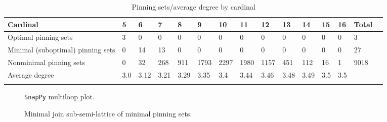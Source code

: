 \documentclass{article}%
\begin{document}
\begin{table}[ht]
	\caption{Pinning sets/average degree by cardinal}
	\centering
	\renewcommand{\arraystretch}{1.5}
	\begin{tabularx}{\textwidth}{lXXXXXXXXXXXXXX}
		\toprule
			Cardinal & 5 & 6 & 7 & 8 & 9 & 10 & 11 & 12 & 13 & 14 & 15 & 16 & Total\\
			\hline
			Optimal pinning sets & 3 & 0 & 0 & 0 & 0 & 0 & 0 & 0 & 0 & 0 & 0 & 0 & 3 \\
			Minimal (suboptimal) pinning sets & 0 & 14 & 13 & 0 & 0 & 0 & 0 & 0 & 0 & 0 & 0 & 0 & 27 \\
			Nonminimal pinning sets & 0 & 32 & 268 & 911 & 1793 & 2297 & 1980 & 1157 & 451 & 112 & 16 & 1 & 9018 \\
			Average degree & 3.0 & 3.12 & 3.21 & 3.29 & 3.35 & 3.4 & 3.44 & 3.46 & 3.48 & 3.49 & 3.5 & 3.5 &  \\
		\bottomrule \\ 
	\end{tabularx}
\end{table}

\begin{multicols}{2}
\begin{figure}[H]
\centering

\caption{\texttt{SnapPy} multiloop plot.}
\label{fig:tex/img/[[18, 22, 1, 19], [19, 12, 20, 11], [17, 28, 18, 23], [21, 13, 22, 14], [1, 13, 2, 12], [20, 2, 21, 3], [10, 23, 11, 24], [5, 16, 6, 17], [6, 27, 7, 28], [14, 7, 15, 8], [3, 25, 4, 24], [4, 9, 5, 10],.svg}
\end{figure}
\columnbreak

\begin{figure}[H]
\centering
\scalebox{0.8}{}
\caption{Minimal join sub-semi-lattice of minimal pinning sets.}
\label{fig:tex/img/[[18, 22, 1, 19], [19, 12, 20, 11], [17, 28, 18, 23], [21, 13, 22, 14], [1, 13, 2, 12], [20, 2, 21, 3], [10, 23, 11, 24], [5, 16, 6, 17], [6, 27, 7, 28], [14, 7, 15, 8], [3, 25, 4, 24], [4, 9, 5, 10],.pgf}
\end{figure}
\end{multicols}
\end{document}
